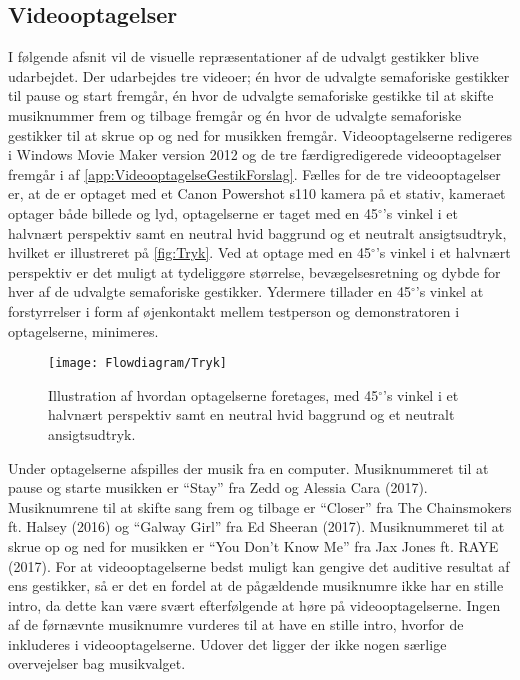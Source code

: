 \subsection{Videooptagelser}
\label{VideooptagelserValgAfGestikker}
%
I følgende afsnit vil de visuelle repræsentationer af de udvalgt gestikker blive udarbejdet. Der udarbejdes tre videoer; én hvor de udvalgte semaforiske gestikker til pause og start fremgår, én hvor de udvalgte semaforiske gestikke til at skifte musiknummer frem og tilbage fremgår og én hvor de udvalgte semaforiske gestikker til at skrue op og ned for musikken fremgår. Videooptagelserne redigeres i Windows Movie Maker version 2012 og de tre færdigredigerede videooptagelser fremgår i af \autoref{app:VideooptagelseGestikForslag}.\blankline
%
Fælles for de tre videooptagelser er, at de er optaget med et Canon Powershot s110 kamera på et stativ, kameraet optager både billede og lyd, optagelserne er taget med en 45$^{\circ}$'s vinkel i et halvnært perspektiv samt en neutral hvid baggrund og et neutralt ansigtsudtryk, hvilket er illustreret på \autoref{fig:Tryk}. Ved at optage med en 45$^{\circ}$'s vinkel i et halvnært perspektiv er det muligt at tydeliggøre størrelse, bevægelsesretning og dybde for hver af de udvalgte semaforiske gestikker. Ydermere tillader en 45$^{\circ}$'s vinkel at forstyrrelser i form af øjenkontakt mellem testperson og demonstratoren i optagelserne, minimeres. 
%
\begin{figure}[H]
	\centering
	\texttt{[image: Flowdiagram/Tryk]}
	\caption{Illustration af hvordan optagelserne foretages, med 45$^{\circ}$'s vinkel i et halvnært perspektiv samt en neutral hvid baggrund og et neutralt ansigtsudtryk.}
	\label{fig:Tryk}
\end{figure}
\noindent
%
Under optagelserne afspilles der musik fra en computer. Musiknummeret til at pause og starte musikken er \enquote{Stay} fra Zedd og Alessia Cara (2017). Musiknumrene til at skifte sang frem og tilbage er \enquote{Closer} fra The Chainsmokers ft. Halsey (2016) og \enquote{Galway Girl} fra Ed Sheeran (2017). Musiknummeret til at skrue op og ned for musikken er \enquote{You Don't Know Me} fra Jax Jones ft. RAYE (2017). For at videooptagelserne bedst muligt kan gengive det auditive resultat af ens gestikker, så er det en fordel at de pågældende musiknumre ikke har en stille intro, da dette kan være svært efterfølgende at høre på videooptagelserne. Ingen af de førnævnte musiknumre vurderes til at have en stille intro, hvorfor de inkluderes i videooptagelserne. Udover det ligger der ikke nogen særlige overvejelser bag musikvalget. 

